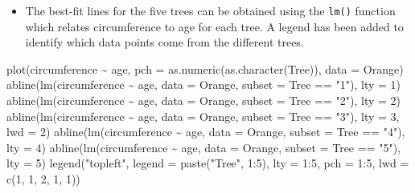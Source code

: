 \documentclass[
  9pt,
  a4paper,
  ignorenonframetext,
  notheorems]{beamer}
\newenvironment{Shaded}{\begin{snugshade}}{\end{snugshade}}
\newcommand{\AttributeTok}[1]{\textcolor[rgb]{0.40,0.45,0.13}{#1}}
\newcommand{\DecValTok}[1]{\textcolor[rgb]{0.68,0.00,0.00}{#1}}
\newcommand{\FunctionTok}[1]{\textcolor[rgb]{0.28,0.35,0.67}{#1}}
\newcommand{\NormalTok}[1]{\textcolor[rgb]{0.00,0.23,0.31}{#1}}
\newcommand{\SpecialCharTok}[1]{\textcolor[rgb]{0.37,0.37,0.37}{#1}}
\newcommand{\StringTok}[1]{\textcolor[rgb]{0.13,0.47,0.30}{#1}}
\providecommand{\tightlist}{%
  \setlength{\itemsep}{0pt}\setlength{\parskip}{0pt}}\usepackage{longtable,booktabs,array}
\begin{document}
\begin{frame}[fragile]
\begin{itemize}
\tightlist
\item
  The best-fit lines for the five trees can be obtained using the
  \texttt{lm()} function which relates circumference to age for each
  tree. A legend has been added to identify which data points come from
  the different trees.
\end{itemize}

\begin{Shaded}
\begin{Highlighting}[]
\FunctionTok{plot}\NormalTok{(circumference }\SpecialCharTok{\textasciitilde{}}\NormalTok{ age, }\AttributeTok{pch =} \FunctionTok{as.numeric}\NormalTok{(}\FunctionTok{as.character}\NormalTok{(Tree)), }\AttributeTok{data =}\NormalTok{ Orange)}
\FunctionTok{abline}\NormalTok{(}\FunctionTok{lm}\NormalTok{(circumference }\SpecialCharTok{\textasciitilde{}}\NormalTok{ age, }\AttributeTok{data =}\NormalTok{ Orange, }\AttributeTok{subset =}\NormalTok{ Tree }\SpecialCharTok{==} \StringTok{"1"}\NormalTok{), }\AttributeTok{lty =} \DecValTok{1}\NormalTok{)}
\FunctionTok{abline}\NormalTok{(}\FunctionTok{lm}\NormalTok{(circumference }\SpecialCharTok{\textasciitilde{}}\NormalTok{ age, }\AttributeTok{data =}\NormalTok{ Orange, }\AttributeTok{subset =}\NormalTok{ Tree }\SpecialCharTok{==} \StringTok{"2"}\NormalTok{), }\AttributeTok{lty =} \DecValTok{2}\NormalTok{)}
\FunctionTok{abline}\NormalTok{(}\FunctionTok{lm}\NormalTok{(circumference }\SpecialCharTok{\textasciitilde{}}\NormalTok{ age, }\AttributeTok{data =}\NormalTok{ Orange, }\AttributeTok{subset =}\NormalTok{ Tree }\SpecialCharTok{==} \StringTok{"3"}\NormalTok{), }\AttributeTok{lty =} \DecValTok{3}\NormalTok{, }\AttributeTok{lwd =} \DecValTok{2}\NormalTok{)}
\FunctionTok{abline}\NormalTok{(}\FunctionTok{lm}\NormalTok{(circumference }\SpecialCharTok{\textasciitilde{}}\NormalTok{ age, }\AttributeTok{data =}\NormalTok{ Orange, }\AttributeTok{subset =}\NormalTok{ Tree }\SpecialCharTok{==} \StringTok{"4"}\NormalTok{), }\AttributeTok{lty =} \DecValTok{4}\NormalTok{)}
\FunctionTok{abline}\NormalTok{(}\FunctionTok{lm}\NormalTok{(circumference }\SpecialCharTok{\textasciitilde{}}\NormalTok{ age, }\AttributeTok{data =}\NormalTok{ Orange, }\AttributeTok{subset =}\NormalTok{ Tree }\SpecialCharTok{==} \StringTok{"5"}\NormalTok{), }\AttributeTok{lty =} \DecValTok{5}\NormalTok{)}
\FunctionTok{legend}\NormalTok{(}\StringTok{"topleft"}\NormalTok{, }\AttributeTok{legend =} \FunctionTok{paste}\NormalTok{(}\StringTok{"Tree"}\NormalTok{, }\DecValTok{1}\SpecialCharTok{:}\DecValTok{5}\NormalTok{), }\AttributeTok{lty =} \DecValTok{1}\SpecialCharTok{:}\DecValTok{5}\NormalTok{, }\AttributeTok{pch =} \DecValTok{1}\SpecialCharTok{:}\DecValTok{5}\NormalTok{, }\AttributeTok{lwd =} \FunctionTok{c}\NormalTok{(}\DecValTok{1}\NormalTok{, }\DecValTok{1}\NormalTok{, }\DecValTok{2}\NormalTok{, }\DecValTok{1}\NormalTok{, }\DecValTok{1}\NormalTok{))}
\end{Highlighting}
\end{Shaded}


\end{frame}
\end{document}
